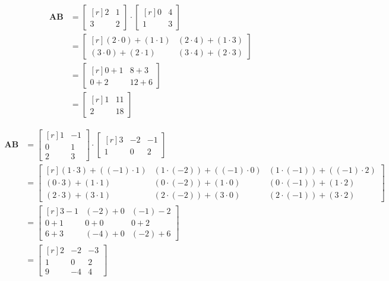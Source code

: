 \solution
	\begin{subproblem}
		\item
			\begin{align*}
				\mathbf{AB} &= \begin{bmatrix*}[r] 2 & 1 \\ 3 & 2 \end{bmatrix*} \cdot \begin{bmatrix*}[r] 0 & 4 \\ 1 & 3 \end{bmatrix*} \\
				            &= \begin{bmatrix*}[r] (2 \cdot 0) + (1 \cdot 1) & (2 \cdot 4) + (1 \cdot 3) \\ (3 \cdot 0) + (2 \cdot 1) & (3 \cdot 4) + (2 \cdot 3) \end{bmatrix*} \\
				            &= \begin{bmatrix*}[r] 0 + 1 & 8 + 3 \\ 0 + 2 & 12 + 6 \end{bmatrix*} \\
				            &= \begin{bmatrix*}[r] 1 & 11 \\ 2 & 18 \end{bmatrix*}
			\end{align*}
		\item
			\begin{align*}
				\mathbf{AB} &= \begin{bmatrix*}[r] 1 &-1 \\ 0 & 1 \\ 2 & 3 \end{bmatrix*} \cdot \begin{bmatrix*}[r] 3 &-2 &-1 \\ 1 & 0 & 2 \end{bmatrix*} \\
				&= \begin{bmatrix*}[r] (1 \cdot 3) + ((-1) \cdot 1) & (1 \cdot (-2)) + ((-1) \cdot 0) & (1 \cdot (-1)) + ((-1) \cdot 2) \\
				                       (0 \cdot 3) + (1 \cdot 1) & (0 \cdot (-2)) + (1 \cdot 0) & (0 \cdot (-1)) + (1 \cdot 2) \\
				                       (2 \cdot 3) + (3 \cdot 1) & (2 \cdot (-2)) + (3 \cdot 0) & (2 \cdot (-1)) + (3 \cdot 2)
				   \end{bmatrix*} \\
				&= \begin{bmatrix*}[r] 3 - 1 & (-2) + 0 & (-1) - 2 \\
				                       0 + 1 & 0 + 0 & 0 + 2 \\
									   6 + 3 & (-4) + 0 & (-2) + 6
				   \end{bmatrix*} \\
				&= \begin{bmatrix*}[r] 2 & -2 & -3 \\
				                       1 & 0 & 2 \\
									   9 & -4 & 4
				   \end{bmatrix*}
			\end{align*}
	\end{subproblem}
